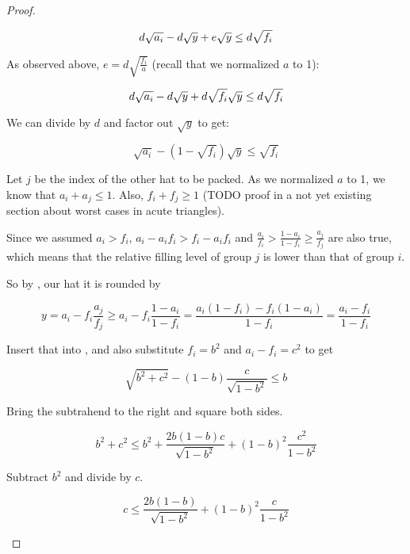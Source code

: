 \documentclass[a4paper,style=print,bibliography=totoc,nexus,lnum,extramargin]{tubsbook}
\begin{document}
\begin{proof}
\begin{itemize}
            \begin{equation*}
                d\sqrt{a_i} - d\sqrt{y} + e\sqrt{y} \le d\sqrt{f_i}\\
            \end{equation*}

            As observed above, $e = d\sqrt{\frac{f_i}{a}}$ (recall that we normalized $a$ to 1):

            \begin{equation*}
                d\sqrt{a_i} - d\sqrt{y} + d\sqrt{f_i}\sqrt{y} \le d\sqrt{f_i}\\
            \end{equation*}

            We can divide by $d$ and factor out $\sqrt{y}$ to get:

            \begin{equation}\label{eq:tripoke}
                \sqrt{a_i} - (1-\sqrt{f_i})\sqrt{y} \le \sqrt{f_i}
            \end{equation}

            Let $j$ be the index of the other hat to be packed.
            As we normalized $a$ to 1, we know that $a_i + a_j \le 1$. Also, $f_i + f_j \ge 1$ (TODO proof in a not yet existing section about worst cases in acute triangles).

            Since we assumed $a_i > f_i$, $a_i - a_if_i > f_i - a_if_i$ and $\frac{a_i}{f_i} > \frac{1-a_i}{1-f_i} \ge \frac{a_j}{f_j}$ are also true, which means that the relative filling level of group $j$ is lower than that of group $i$.

            So by , our hat it is rounded by

            $$y = a_i - f_i\frac{a_j}{f_j} \ge a_i - f_i\frac{1-a_i}{1-f_i} = \frac{a_i(1-f_i)-f_i(1-a_i)}{1-f_i} = \frac{a_i-f_i}{1-f_i}$$

            Insert that into , and also substitute $f_i = b^2$ and $a_i-f_i = c^2$ to get

            $$\sqrt{b^2+c^2} - (1-b)\frac{c}{\sqrt{1-b^2}} \le b$$

            Bring the subtrahend to the right and square both sides.

            $$b^2+c^2 \le b^2 + \frac{2b(1-b)c}{\sqrt{1-b^2}} + (1-b)^2\frac{c^2}{1-b^2}$$

            Subtract $b^2$ and divide by $c$.

            $$c \le \frac{2b(1-b)}{\sqrt{1-b^2}} + (1-b)^2\frac{c}{1-b^2}$$


\end{itemize}
\end{proof}
\end{document}
